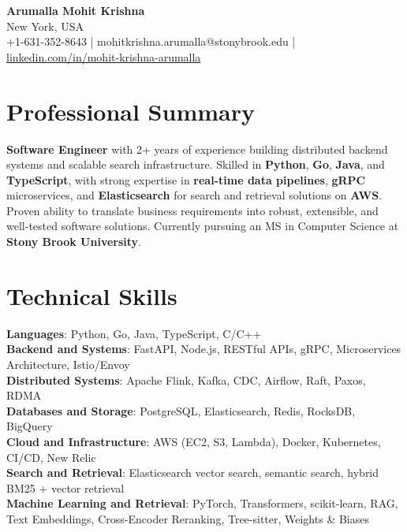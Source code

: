 \documentclass[letterpaper,11pt]{article}
\begin{document}
\begin{center}
  {\Large \textbf{Arumalla Mohit Krishna}} \\
  New York, USA \\
  +1-631-352-8643 \enspace | \enspace mohitkrishna.arumalla@stonybrook.edu \enspace | \enspace \href{https://www.linkedin.com/in/mohit-krishna-arumalla}{linkedin.com/in/mohit-krishna-arumalla}
\end{center}

\section{Professional Summary}
  \begin{itemize}[leftmargin=0.15in, label={}]
    \small{\item{
     \textbf{Software Engineer} with 2+ years of experience building distributed backend systems and scalable search infrastructure. Skilled in \textbf{Python}, \textbf{Go}, \textbf{Java}, and \textbf{TypeScript}, with strong expertise in \textbf{real-time data pipelines}, \textbf{gRPC} microservices, and \textbf{Elasticsearch} for search and retrieval solutions on \textbf{AWS}. Proven ability to translate business requirements into robust, extensible, and well-tested software solutions. Currently pursuing an MS in Computer Science at \textbf{Stony Brook University}.
    }}
  \end{itemize}
\vspace{-16pt}

\section{Technical Skills}
 \begin{itemize}[leftmargin=0.15in, label={}]
    \small{\item{
     \textbf{Languages}: Python, Go, Java, TypeScript, C/C++ \\
     \textbf{Backend and Systems}: FastAPI, Node.js, RESTful APIs, gRPC, Microservices Architecture, Istio/Envoy \\
     \textbf{Distributed Systems}: Apache Flink, Kafka, CDC, Airflow, Raft, Paxos, RDMA \\
     \textbf{Databases and Storage}: PostgreSQL, Elasticsearch, Redis, RocksDB, BigQuery \\
     \textbf{Cloud and Infrastructure}: AWS (EC2, S3, Lambda), Docker, Kubernetes, CI/CD, New Relic \\
     \textbf{Search and Retrieval}: Elasticsearch vector search, semantic search, hybrid BM25 + vector retrieval \\
     \textbf{Machine Learning and Retrieval}: PyTorch, Transformers, scikit-learn, RAG, Text Embeddings, Cross-Encoder Reranking, Tree-sitter, Weights \& Biases
    }}
 \end{itemize}
\vspace{-16pt}
\end{document}
